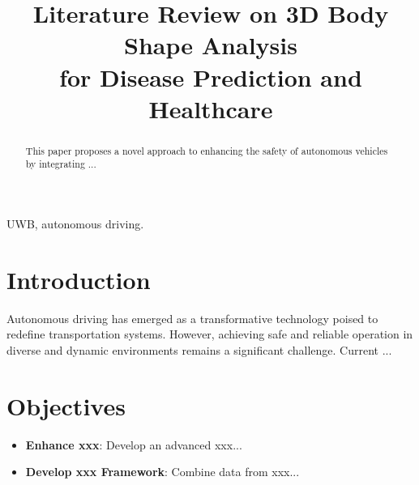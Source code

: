 \documentclass[conference, 12pt]{IEEEtran}
\begin{document}
\title{
Literature Review on 3D Body Shape Analysis \\
for Disease Prediction and Healthcare 
}

\author{




}
\maketitle

\begin{abstract}
This paper proposes a novel approach to enhancing the safety of autonomous vehicles by integrating ...
\end{abstract}

\begin{IEEEkeywords}
UWB, autonomous driving.
\end{IEEEkeywords}

\section{Introduction}
\label{sec:intro}
\setlength{\parindent}{0pt}

Autonomous driving has emerged as a transformative technology poised to redefine transportation systems. However, achieving safe and reliable operation in diverse and dynamic environments remains a significant challenge. Current ...







\section{Objectives}

\begin{itemize}
\item \textbf{Enhance xxx}: Develop an advanced xxx...
\item \textbf{Develop xxx Framework}: Combine data from xxx...
\end{itemize}
\end{document}
